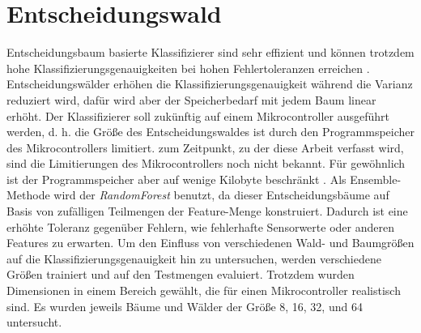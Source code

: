 \section{Entscheidungswald}
\label{sec:model_dt}
Entscheidungsbaum basierte Klassifizierer sind sehr effizient und können trotzdem hohe Klassifizierungsgenauigkeiten bei hohen Fehlertoleranzen erreichen \cite{dymelThesis}.
Entscheidungswälder erhöhen die Klassifizierungsgenauigkeit während die Varianz reduziert wird, dafür wird aber der Speicherbedarf mit jedem Baum linear erhöht.
Der Klassifizierer soll zukünftig auf einem Mikrocontroller ausgeführt werden, d. h. die Größe des Entscheidungswaldes ist durch den Programmspeicher des Mikrocontrollers limitiert.
zum Zeitpunkt, zu der diese Arbeit verfasst wird, sind die Limitierungen des Mikrocontrollers noch nicht bekannt.
Für gewöhnlich ist der Programmspeicher aber auf wenige Kilobyte beschränkt \cite{dymelThesis}.
\newline
\newline
Als Ensemble-Methode wird der \textit{RandomForest} benutzt, da dieser Entscheidungsbäume auf Basis von zufälligen Teilmengen der Feature-Menge konstruiert.
Dadurch ist eine erhöhte Toleranz gegenüber Fehlern, wie fehlerhafte Sensorwerte oder anderen Features zu erwarten.
\newline
\newline
Um den Einfluss von verschiedenen Wald- und Baumgrößen auf die Klassifizierungsgenauigkeit hin zu untersuchen, werden verschiedene Größen
trainiert und auf den Testmengen evaluiert. Trotzdem wurden Dimensionen in einem Bereich gewählt, die für einen Mikrocontroller realistisch sind.
Es wurden jeweils Bäume und Wälder der Größe 8, 16, 32, und 64 untersucht.